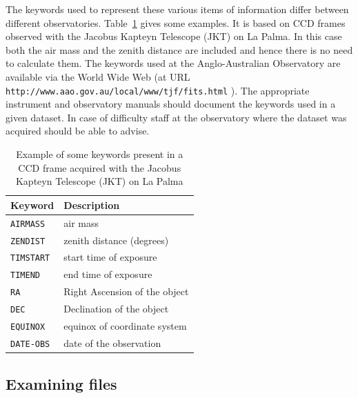 \documentclass[twoside,11pt]{article}
\newcommand{\htmladdnormallink}[2]{#1}
\newcommand{\xlabel}[1]{}
\begin{document}
The keywords used to represent these various items of information differ
between different observatories.  Table~\ref{KEYWORD} gives some
examples.  It is based on CCD frames observed with the Jacobus Kapteyn
Telescope (JKT) on La Palma.  In this case both the air mass and the
zenith distance are included and hence there is no need to calculate
them.  The keywords used at the Anglo-Australian Observatory are
available via the World Wide Web (at URL
\htmladdnormallink{ {\tt http://www.aao.gov.au/local/www/tjf/fits.html} }
{http://www.aao.gov.au/local/www/tjf/fits.html}).  The appropriate
instrument and observatory manuals should document the keywords used
in a given dataset.  In case of difficulty staff at the observatory
where the dataset was acquired should be able to advise.

\begin{table}[htbp]

\begin{center}
\begin{tabular}{ll}
Keyword        &  Description               \\  \hline
{\tt AIRMASS}  &  air mass                  \\
{\tt ZENDIST}  &  zenith distance (degrees) \\
{\tt TIMSTART} &  start time of exposure    \\
{\tt TIMEND}   &  end time of exposure      \\
{\tt RA}       &  Right Ascension of the object \\
{\tt DEC}      &  Declination of the object \\
{\tt EQUINOX}  &  equinox of coordinate system  \\
{\tt DATE-OBS} &  date of the observation   \\
\end{tabular}
\end{center}

\begin{quote}
\caption[Example of some observation keywords]{Example 
of some keywords present in a CCD frame acquired with the Jacobus
Kapteyn Telescope (JKT) on La Palma
\label{KEYWORD} }
\end{quote}

\end{table}

\subsection{\xlabel{EXAMFILE}Examining files}
\end{document}
